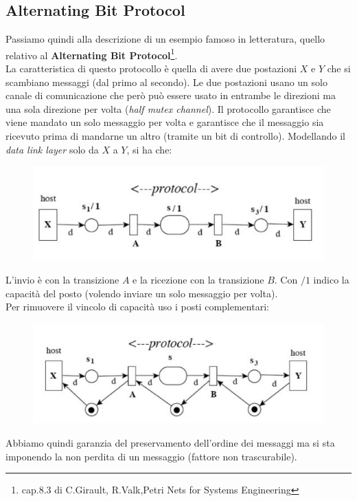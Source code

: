 \documentclass[a4paper,12pt, oneside]{book}
\begin{document}
\subsection{Alternating Bit Protocol}
Passiamo quindi alla descrizione di un esempio famoso in letteratura, quello
relativo al \textbf{Alternating Bit Protocol}\footnote{cap.8.3 di C.Girault,
  R.Valk,Petri Nets for Systems Engineering}.\\
La caratteristica di questo protocollo è quella di avere due postazioni $X$ e
$Y$ che si scambiano messaggi (dal primo al secondo). Le due postazioni usano un
solo canale di comunicazione che però può essere usato in entrambe le direzioni
ma una sola direzione per volta (\textit{half mutex channel}). Il protocollo
garantisce che viene mandato un solo messaggio per volta e garantisce che il
messaggio sia ricevuto prima di mandarne un altro (tramite un bit di
controllo). Modellando il \textit{data link layer} solo da $X$ a $Y$, si ha che: 
\begin{figure}[H]
  \centering
  \includegraphics[scale = 0.7]{img/abt.jpg}
\end{figure}
L'invio è con la transizione $A$ e la ricezione con la transizione $B$. Con $/1$
indico la capacità del posto (volendo inviare un solo messaggio per volta).\\
Per rimuovere il vincolo di capacità uso i posti complementari:
\begin{figure}[H]
  \centering
  \includegraphics[scale = 0.7]{img/abt2.jpg}
\end{figure}
Abbiamo quindi garanzia del preservamento dell'ordine dei messaggi ma si sta
imponendo la non perdita di un messaggio (fattore non trascurabile).
\end{document}
